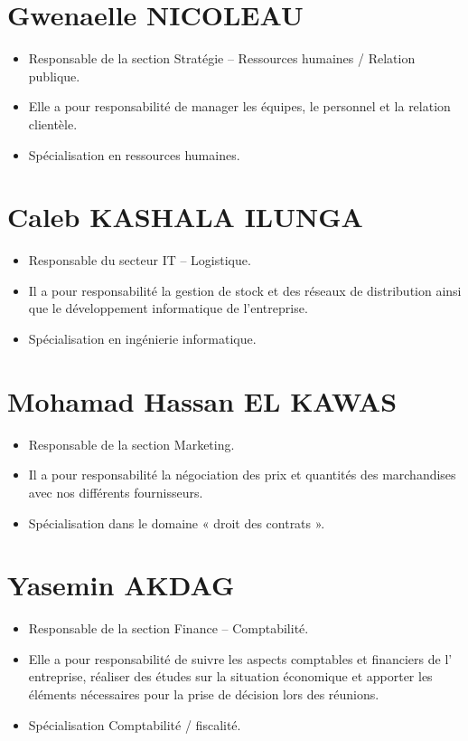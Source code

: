 \documentclass[12pt,a4paper]{report}
\begin{document}
		\section{Gwenaelle NICOLEAU}
		
			\begin{itemize}
				\item Responsable de la section Stratégie – Ressources humaines / Relation publique.
				\item Elle a pour responsabilité de manager les équipes, le personnel et la relation clientèle.
				\item Spécialisation en ressources humaines.
	
			\end{itemize}
		
		\section{Caleb KASHALA ILUNGA}
			\begin{itemize}
				\item  Responsable du secteur IT – Logistique.
				\item Il a pour responsabilité la gestion de stock et des réseaux de distribution ainsi que le développement informatique de l’entreprise.
				\item Spécialisation en ingénierie informatique.
	
			\end{itemize}		 
		
		\section{Mohamad Hassan EL KAWAS}
			\begin{itemize}
				\item Responsable de la section Marketing.
				\item Il a pour responsabilité la négociation des prix et quantités des marchandises avec nos différents fournisseurs.
				\item Spécialisation dans le domaine « droit des contrats ».
	
			\end{itemize}
		\section{Yasemin AKDAG}
			\begin{itemize}
				\item Responsable de la section Finance – Comptabilité.
				\item Elle a pour responsabilité de suivre les aspects comptables et financiers de l’ entreprise, réaliser des études sur la situation économique et apporter les éléments nécessaires pour la prise de décision lors des réunions.
				\item Spécialisation Comptabilité / fiscalité.
			
			\end{itemize}
\end{document}
